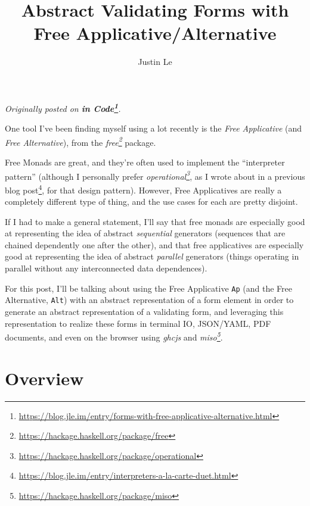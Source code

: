 \documentclass[]{article}
\title{Abstract Validating Forms with Free Applicative/Alternative}
\author{Justin Le}
\renewcommand{\href}[2]{#2\footnote{\url{#1}}}
\begin{document}
\maketitle

\emph{Originally posted on
\textbf{\href{https://blog.jle.im/entry/forms-with-free-applicative-alternative.html}{in
Code}}.}

One tool I've been finding myself using a lot recently is the \emph{Free
Applicative} (and \emph{Free Alternative}), from the
\emph{\href{https://hackage.haskell.org/package/free}{free}} package.

Free Monads are great, and they're often used to implement the ``interpreter
pattern'' (although I personally prefer
\emph{\href{https://hackage.haskell.org/package/operational}{operational}}, as I
wrote about in a
\href{https://blog.jle.im/entry/interpreters-a-la-carte-duet.html}{previous blog
post}, for that design pattern). However, Free Applicatives are really a
completely different type of thing, and the use cases for each are pretty
disjoint.

If I had to make a general statement, I'll say that free monads are especially
good at representing the idea of abstract \emph{sequential} generators
(sequences that are chained dependently one after the other), and that free
applicatives are especially good at representing the idea of abstract
\emph{parallel} generators (things operating in parallel without any
interconnected data dependences).

For this post, I'll be talking about using the Free Applicative \texttt{Ap} (and
the Free Alternative, \texttt{Alt}) with an abstract representation of a form
element in order to generate an abstract representation of a validating form,
and leveraging this representation to realize these forms in terminal IO,
JSON/YAML, PDF documents, and even on the browser using \emph{ghcjs} and
\emph{\href{https://hackage.haskell.org/package/miso}{miso}}.

\hypertarget{overview}{%
\section{Overview}\label{overview}}
\end{document}

